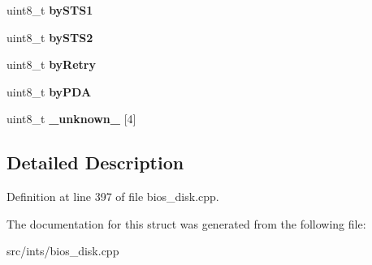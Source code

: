 \begin{DoxyCompactItemize}
\item 
\hypertarget{structNFDHDR__ENTRY_abec47658947ee28c2e4ca8c4dd4f8e67}{uint8\-\_\-t {\bfseries by\-S\-T\-S1}}\label{structNFDHDR__ENTRY_abec47658947ee28c2e4ca8c4dd4f8e67}

\item 
\hypertarget{structNFDHDR__ENTRY_a76165625648c61f101c79870a495fc2e}{uint8\-\_\-t {\bfseries by\-S\-T\-S2}}\label{structNFDHDR__ENTRY_a76165625648c61f101c79870a495fc2e}

\item 
\hypertarget{structNFDHDR__ENTRY_a47f3e2a7112f5459ec0eb59768949f3e}{uint8\-\_\-t {\bfseries by\-Retry}}\label{structNFDHDR__ENTRY_a47f3e2a7112f5459ec0eb59768949f3e}

\item 
\hypertarget{structNFDHDR__ENTRY_ac530386ff5d24cafbb8c6df6cbfb12d8}{uint8\-\_\-t {\bfseries by\-P\-D\-A}}\label{structNFDHDR__ENTRY_ac530386ff5d24cafbb8c6df6cbfb12d8}

\item 
\hypertarget{structNFDHDR__ENTRY_a2382030bc4ae46a87214367d4e8f978b}{uint8\-\_\-t {\bfseries \-\_\-unknown\-\_\-} \mbox{[}4\mbox{]}}\label{structNFDHDR__ENTRY_a2382030bc4ae46a87214367d4e8f978b}

\end{DoxyCompactItemize}


\subsection{Detailed Description}


Definition at line 397 of file bios\-\_\-disk.\-cpp.



The documentation for this struct was generated from the following file\-:\begin{DoxyCompactItemize}
\item 
src/ints/bios\-\_\-disk.\-cpp\end{DoxyCompactItemize}
